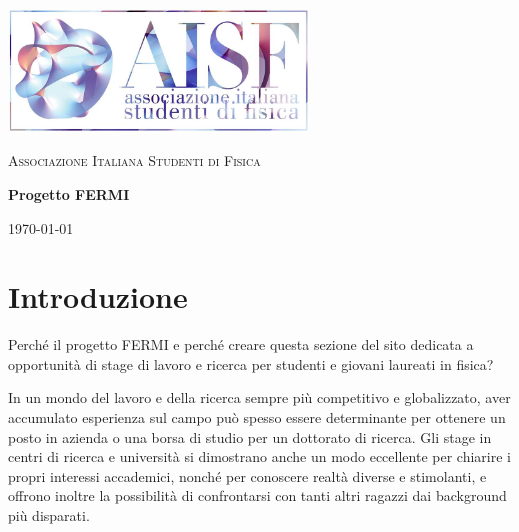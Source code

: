\documentclass[a4paper,10pt]{article}
\begin{document}
\begin{titlepage}

	\centering
	\includegraphics[width= 80mm]{logo_full.jpg}\par\vspace{1cm}
	{\scshape\LARGE Associazione Italiana Studenti di Fisica \par}
	\vspace{3cm}
	{\huge\bfseries Progetto FERMI\par}

        \vspace{2cm}
	\vfill

	{\centering \large \today\par} %

\end{titlepage}

\newpage

\section*{Introduzione} %

Perché il progetto FERMI e perché creare questa sezione del sito dedicata a opportunità di stage di lavoro e ricerca per studenti e giovani laureati in fisica? \newline

In un mondo del lavoro e della ricerca sempre più competitivo e globalizzato, aver accumulato esperienza sul campo può spesso essere determinante per ottenere un posto in azienda o una borsa di studio per un dottorato di ricerca. Gli stage in centri di ricerca e università si dimostrano anche un modo eccellente per chiarire i propri interessi accademici, nonché per conoscere realtà diverse e stimolanti, e offrono inoltre la possibilità di confrontarsi con tanti altri ragazzi dai background più disparati. \newline
\end{document}
